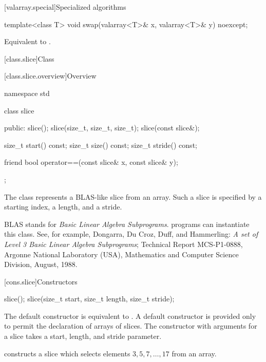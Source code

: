 [valarray.special]{Specialized algorithms}

%
\begin{itemdecl}
template<class T> void swap(valarray<T>& x, valarray<T>& y) noexcept;
\end{itemdecl}

\begin{itemdescr}
\pnum
\effects
Equivalent to .
\end{itemdescr}


[class.slice]{Class }

[class.slice.overview]{Overview}

%
\begin{codeblock}
namespace std {
  class slice {
  public:
    slice();
    slice(size_t, size_t, size_t);
    slice(const slice&);

    size_t start() const;
    size_t size() const;
    size_t stride() const;

    friend bool operator==(const slice& x, const slice& y);
  };
}
\end{codeblock}

\pnum
The 
class represents a BLAS-like slice from an array.
Such a slice is specified by a starting index, a length, and a
stride.
\begin{footnote}
BLAS stands for
\textit{Basic Linear Algebra Subprograms}.
\Cpp{} programs can instantiate this class.
See, for example,
Dongarra, Du Croz, Duff, and Hammerling:
\textit{A set of Level 3 Basic Linear Algebra Subprograms};
Technical Report MCS-P1-0888,
Argonne National Laboratory (USA),
Mathematics and Computer Science Division,
August, 1988.
\end{footnote}

[cons.slice]{Constructors}

%
\begin{itemdecl}
slice();
slice(size_t start, size_t length, size_t stride);
\end{itemdecl}

\begin{itemdescr}
\pnum
The default constructor is equivalent to .
A default constructor is provided only to permit the declaration of arrays of slices.
The constructor with arguments for a slice takes a start, length, and stride
parameter.

\pnum
\begin{example}
constructs a slice which selects elements $3, 5, 7, \dotsc, 17$ from an array.
\end{example}
\end{itemdescr}


